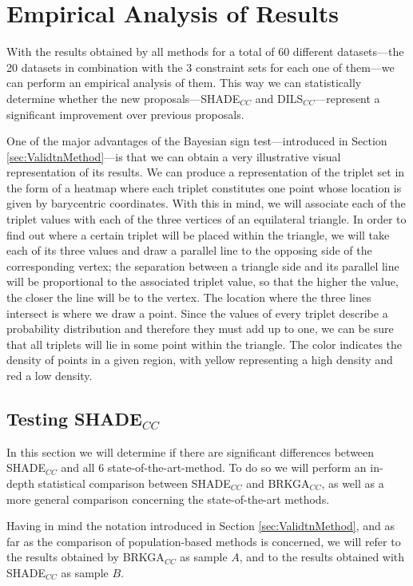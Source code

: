 \chapter{Empirical Analysis of Results} \label{ch:AnalysisResults}

With the results obtained by all methods for a total of 60 different datasets---the 20 datasets in combination with the 3 constraint sets for each one of them---we can perform an empirical analysis of them. This way we can statistically determine whether the new proposals---\acs{SHADE}$_{CC}$ and \acs{DILS}$_{CC}$---represent a significant improvement over previous proposals.

One of the major advantages of the Bayesian sign test---introduced in Section \ref{sec:ValidtnMethod}---is that we can obtain a very illustrative visual representation of its results. We can produce a representation of the triplet set in the form of a heatmap where each triplet constitutes one point whose location is given by barycentric coordinates. With this in mind, we will associate each of the triplet values with each of the three vertices of an equilateral triangle. In order to find out where a certain triplet will be placed within the triangle, we will take each of its three values and draw a parallel line to the opposing side of the corresponding vertex; the separation between a triangle side and its parallel line will be proportional to the associated triplet value, so that the higher the value, the closer the line will be to the vertex. The location where the three lines intersect is where we draw a point. Since the values of every triplet describe a probability distribution and therefore they must add up to one, we can be sure that all triplets will lie in some point within the triangle. The color indicates the density of points in a given region, with yellow representing a high density and red a low density.

\section{Testing SHADE$_{CC}$} \label{sec:TestSHADE}

In this section we will determine if there are significant differences between \acs{SHADE}$_{CC}$ and all 6 state-of-the-art-method. To do so we will perform an in-depth statistical comparison between \acs{SHADE}$_{CC}$ and \acs{BRKGA}$_{CC}$, as well as a more general comparison concerning the state-of-the-art methods.

Having in mind the notation introduced in Section \ref{sec:ValidtnMethod}, and as far as the comparison of population-based methods is concerned, we will refer to the results obtained by \acs{BRKGA}$_{CC}$ as sample $A$, and to the results obtained with \acs{SHADE}$_{CC}$ as sample $B$.


